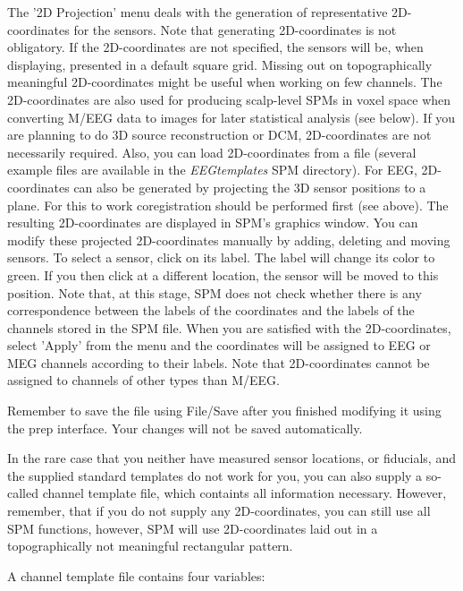 The '2D Projection' menu deals with the generation of representative
2D-coordinates for the sensors. Note that generating 2D-coordinates is
not 
obligatory. If the 2D-coordinates are not specified, the sensors will
be, when displaying, presented in a default square grid. Missing out
on topographically meaningful 2D-coordinates might be useful when
working on few channels. The 2D-coordinates are also used for
producing scalp-level SPMs in voxel space when converting M/EEG data
to images for later statistical analysis (see below). If you are 
planning to do 3D source reconstruction or 
DCM, 2D-coordinates are not necessarily required. Also, you can load
2D-coordinates from a file (several example files are available in
the \textit{EEGtemplates} SPM directory). For EEG, 2D-coordinates can also
be generated by projecting the 3D sensor positions to a plane. For
this to work coregistration should be performed first (see
above). The resulting 2D-coordinates are displayed in SPM's graphics 
window. You can modify these projected 2D-coordinates
manually by adding, deleting and moving sensors. To select a sensor,
click on its label. The label will change its color to green. If
you then click at a different location, the sensor will be
moved to this position. Note that, at this stage, SPM does not
check whether there is any correspondence between the labels of the
coordinates and the labels of the channels stored in the SPM
file. When you are satisfied with the 2D-coordinates, select 'Apply'  
from the menu and the coordinates will be assigned to EEG or MEG
channels according to their labels. Note that 2D-coordinates cannot 
be assigned to channels of other types than M/EEG.  

Remember to save the file using File/Save after you finished modifying
it using the prep interface. Your changes will not be saved
automatically.

In the rare case that you neither have measured sensor locations,
or fiducials, and the supplied standard templates do not work for you,
you can also supply a so-called channel template file, which containts
all information necessary. However, remember, that if you do not
supply any 2D-coordinates, you can still use all SPM functions,
however, SPM will use 2D-coordinates laid out in a topographically not 
meaningful rectangular pattern.

A channel template file contains four variables:\\

